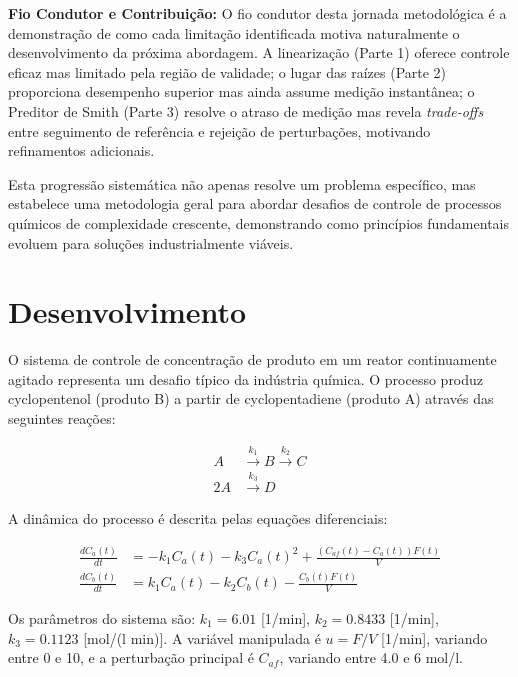 \documentclass[a4paper,12pt]{article}
\begin{document}
\textbf{Fio Condutor e Contribuição:}
O fio condutor desta jornada metodológica é a demonstração de como cada limitação identificada motiva naturalmente o desenvolvimento da próxima abordagem. A linearização (Parte 1) oferece controle eficaz mas limitado pela região de validade; o lugar das raízes (Parte 2) proporciona desempenho superior mas ainda assume medição instantânea; o Preditor de Smith (Parte 3) resolve o atraso de medição mas revela \textit{trade-offs} entre seguimento de referência e rejeição de perturbações, motivando refinamentos adicionais.

Esta progressão sistemática não apenas resolve um problema específico, mas estabelece uma metodologia geral para abordar desafios de controle de processos químicos de complexidade crescente, demonstrando como princípios fundamentais evoluem para soluções industrialmente viáveis.

\newpage

\section{Desenvolvimento}
\label{chap:desenvolvimento}

O sistema de controle de concentração de produto em um reator continuamente agitado representa um desafio típico da indústria química. O processo produz cyclopentenol (produto B) a partir de cyclopentadiene (produto A) através das seguintes reações:

\begin{align}
A &\xrightarrow{k_1} B \xrightarrow{k_2} C \\
2A &\xrightarrow{k_3} D
\end{align}

A dinâmica do processo é descrita pelas equações diferenciais:

\begin{align}
\frac{dC_a(t)}{dt} &= -k_1 C_a(t) - k_3 C_a(t)^2 + \frac{(C_{af}(t) - C_a(t)) F(t)}{V} \\
\frac{dC_b(t)}{dt} &= k_1 C_a(t) - k_2 C_b(t) - \frac{C_b(t) F(t)}{V}
\end{align}

Os parâmetros do sistema são: $k_1 = 6.01$ [1/min], $k_2 = 0.8433$ [1/min], $k_3 = 0.1123$ [mol/(l min)]. A variável manipulada é $u = F/V$ [1/min], variando entre 0 e 10, e a perturbação principal é $C_{af}$, variando entre 4.0 e 6 mol/l.
\end{document}
